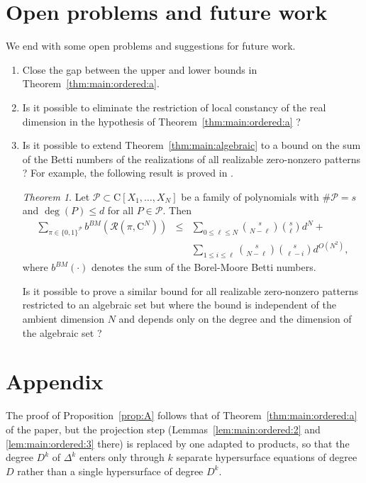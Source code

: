 \documentclass[10pt]{amsart}
\theoremstyle{definition}
\theoremstyle{remark}
\newtheorem{thmx}{Theorem}
\numberwithin{equation}{section}
\newcommand {\C}     {\mathrm{C}}
\newcommand {\RR} {{\mathcal R}}
\begin{document}
\section{Open problems and future work}
\label{sec:conclusion}
We end with some open problems and suggestions for future work.
\begin{enumerate}[1.]
    \item Close the gap between the upper and lower bounds in Theorem~\ref{thm:main:ordered:a}.
    
    \item Is it possible to eliminate the restriction of local constancy of the real dimension in the hypothesis of Theorem~\ref{thm:main:ordered:a} ? 
    \item Is it possible to extend Theorem~\ref{thm:main:algebraic} to a bound on the sum of the Betti numbers of the realizations of all realizable zero-nonzero patterns ? 
    For example, the following result is proved in \cite{BPR-tight}.

\begin{thmx}
\label{thmx:BPRtight}
Let ${\mathcal P} \subset \C[X_1,\ldots,X_N]$ be a family of polynomials
with $\#{\mathcal P} = s$ and $\deg(P) \leq d$ for all $P \in {\mathcal P}$.
Then
\begin{eqnarray*}
\sum_{\pi \in \{0,1\}^{\mathcal{P}}}
b^{BM}(\RR(\pi,\C^N))  & \leq &  
\sum_{0 \leq \ell \leq N}
\binom{s}{N-\ell}\binom{s}{\ell}d^N 
 + \\
 &&\sum_{1 \leq i \leq \ell} \binom{s}{N - \ell}\binom{s}{\ell - i}d^{O(N^2)}
,
\end{eqnarray*}
where $b^{BM}(\cdot)$ denotes the sum of the Borel-Moore Betti numbers.
\end{thmx}
Is it possible to prove a similar bound for all realizable zero-nonzero patterns restricted to an algebraic set but where the bound is independent of the ambient dimension $N$ and depends only on the degree and the dimension of the algebraic set ?
\end{enumerate}

\section{Appendix}
\label{sec:appendix}
The proof of Proposition~\ref{prop:A} follows that of Theorem~\ref{thm:main:ordered:a} of the paper, but the projection step (Lemmas~\ref{lem:main:ordered:2} and \ref{lem:main:ordered:3} there) is replaced by one adapted to products, so that the degree $D^k$ of $\Delta^k$ enters only through $k$ separate hypersurface equations of degree $D$ rather than a single hypersurface of degree $D^k$.
\end{document}
